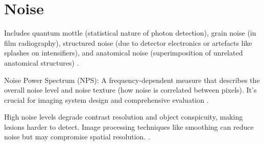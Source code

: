\chapter{Noise}

Includes quantum mottle (statistical nature of photon detection),
grain noise (in film radiography), structured noise (due to detector
electronics or artefacts like splashes on intensifiers), and
anatomical noise (superimposition of unrelated anatomical structures)
\cite{bushberg2011essential}.


Noise Power Spectrum (NPS): A frequency-dependent measure that
describes the overall noise level and noise texture (how noise is
correlated between pixels). It's crucial for imaging system design and
comprehensive evaluation \cite{bushberg2011essential}.

High noise levels degrade contrast resolution and object conspicuity,
making lesions harder to detect. Image processing techniques like
smoothing can reduce noise but may compromise spatial
resolution. \cite{bushberg2011essential}.